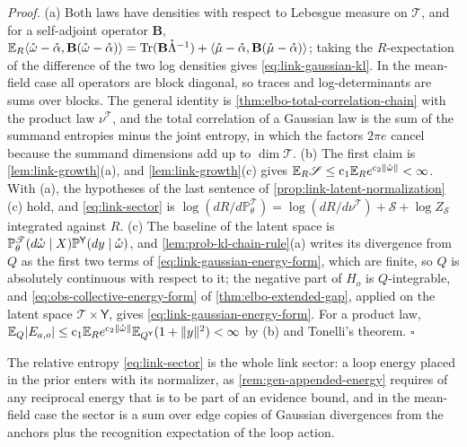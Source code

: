 \noindent\emph{Proof.}
(a) Both laws have densities with respect to Lebesgue measure on $\mathscr T$, and for a self-adjoint
operator $\mathbf B$, $\mathbb E_R\langle\mathring\omega-\mathring\alpha,\mathbf B(\mathring\omega-\mathring\alpha)\rangle
=\operatorname{Tr}(\mathbf B\mathring\Lambda^{-1})+\langle\mathring\mu-\mathring\alpha,\mathbf B(\mathring\mu-\mathring\alpha)\rangle$;
taking the $R$-expectation of the difference of the two log densities gives \eqref{eq:link-gaussian-kl}. In
the mean-field case all operators are block diagonal, so traces and log-determinants are sums over blocks.
The general identity is \cref{thm:elbo-total-correlation-chain} with the product law $\nu^{\mathscr T}$,
and the total correlation of a Gaussian law is the sum of the summand entropies minus the joint entropy,
in which the factors $2\pi e$ cancel because the summand dimensions add up to $\dim\mathscr T$. (b) The
first claim is \cref{lem:link-growth}(a), and \cref{lem:link-growth}(c) gives
$\mathbb E_R\mathscr S\leq\mathrm c_1\mathbb E_Re^{\mathrm c_2\lVert\mathring\omega\rVert}<\infty$. With (a), the hypotheses of
the last sentence of \cref{prop:link-latent-normalization}(c) hold, and \eqref{eq:link-sector} is
$\log(dR/d\mathbb P^{\mathscr T}_\theta)=\log(dR/d\nu^{\mathscr T})+\mathscr S+\log Z_{\mathscr S}$ integrated
against $R$. (c) The baseline of the latent space is
$\mathbb P^{\mathscr T}_\theta(d\mathring\omega\mid X)\mathbb P^{\mathsf Y}(dy\mid\mathring\omega)$, and
\cref{lem:prob-kl-chain-rule}(a) writes its divergence from $Q$ as the first two terms of
\eqref{eq:link-gaussian-energy-form}, which are finite, so $Q$ is absolutely continuous with respect to
it; the negative part of $H_o$ is $Q$-integrable, and \eqref{eq:obs-collective-energy-form} of
\cref{thm:elbo-extended-gap}, applied on the latent space $\mathscr T\times\mathsf Y$, gives
\eqref{eq:link-gaussian-energy-form}. For a product law,
$\mathbb E_Q\lvert E_{a,o}\rvert\leq\mathrm c_1\mathbb E_Re^{\mathrm c_2\lVert\mathring\omega\rVert}\mathbb E_{Q^{\mathsf Y}}(1+\lVert y\rVert^2)<\infty$
by (b) and Tonelli's theorem. \hfill$\square$

The relative entropy \eqref{eq:link-sector} is the whole link sector: a loop energy placed in the prior
enters with its normalizer, as \cref{rem:gen-appended-energy} requires of any reciprocal energy that is to
be part of an evidence bound, and in the mean-field case the sector is a sum over edge copies of Gaussian
divergences from the anchors plus the recognition expectation of the loop action.


